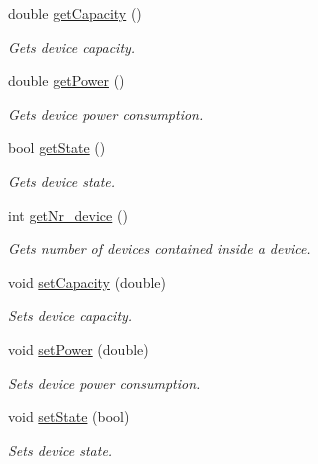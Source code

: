 \begin{DoxyCompactItemize}
double \hyperlink{classdevice_ae444f5ce9e539235bc5df36f7b47609c}{getCapacity} ()
\begin{DoxyCompactList}\small\item\em Gets device capacity. \item\end{DoxyCompactList}\item 
double \hyperlink{classdevice_af7b6d78ad457ad75a5f3ed2b40266017}{getPower} ()
\begin{DoxyCompactList}\small\item\em Gets device power consumption. \item\end{DoxyCompactList}\item 
bool \hyperlink{classdevice_a287ef719b436c552cb78f498869ce590}{getState} ()
\begin{DoxyCompactList}\small\item\em Gets device state. \item\end{DoxyCompactList}\item 
int \hyperlink{classdevice_aba1387d01eac1fa58a5386395b368384}{getNr\_\-device} ()
\begin{DoxyCompactList}\small\item\em Gets number of devices contained inside a device. \item\end{DoxyCompactList}\item 
void \hyperlink{classdevice_a66b66e2bce25b091d651ee6336f6f40e}{setCapacity} (double)
\begin{DoxyCompactList}\small\item\em Sets device capacity. \item\end{DoxyCompactList}\item 
void \hyperlink{classdevice_a43b8093ad785d5b5787751a7ede0ae73}{setPower} (double)
\begin{DoxyCompactList}\small\item\em Sets device power consumption. \item\end{DoxyCompactList}\item 
void \hyperlink{classdevice_a8479767364d2d7a6e349552eb6bae023}{setState} (bool)
\begin{DoxyCompactList}\small\item\em Sets device state. \item\end{DoxyCompactList}\end{DoxyCompactItemize}


